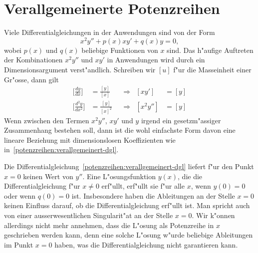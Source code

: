 \section{Verallgemeinerte Potenzreihen
\label{section:potenzreihen:verallgemeinert}}
Viele Differentialgleichungen in der Anwendungen sind von der Form
\begin{equation}
x^2y''+p(x)xy'+q(x)y=0,
\label{potenzreihen:verallgemeinert-dgl}
\end{equation}
wobei $p(x)$ und $q(x)$ beliebige Funktionen von $x$ sind.
Das h"aufige Auftreten der Kombinationen $x^2y''$ und $xy'$ in Anwendungen
wird durch ein Dimensionsargument verst"andlich.
Schreiben wir $[u]$ f"ur die Masseinheit einer Gr"osse, dann gilt
\begin{equation*}
\begin{aligned}
\biggl[\frac{dy}{dx}\biggr]
&=
\frac{[y]}{[x]}
&
&\Rightarrow&
[xy']&=[y]\\
\biggl[\frac{d^2y}{dx^2}\biggr]
&=
\frac{[y]}{[x]^2}
&
&\Rightarrow&
[x^2y'']&=[y]
\end{aligned}
\end{equation*}
Wenn zwischen den Termen $x^2y''$, $xy'$ und $y$ irgend ein
gesetzm"assiger Zusammenhang bestehen soll, dann ist die wohl
einfachste Form davon eine lineare Beziehung mit dimensionslosen
Koeffizienten wie in~\eqref{potenzreihen:verallgemeinert-dgl}.

Die Differentialgleichung~\eqref{potenzreihen:verallgemeinert-dgl}
liefert f"ur den Punkt $x=0$ keinen Wert von $y''$.
Eine L"osungsfunktion $y(x)$, die die Differentialgleichung f"ur
$x\ne 0$ erf"ullt, erf"ullt sie f"ur alle $x$, wenn $y(0)=0$ oder
wenn $q(0)=0$ ist. 
Insbesondere haben die Ableitungen an der Stelle $x=0$ keinen
Einfluss darauf, ob die Differentialgleichung erf"ullt ist.
Man spricht auch von einer ausserwesentlichen Singularit"at an
der Stelle $x=0$.
Wir k"onnen allerdings nicht mehr annehmen, dass die L"osung als
Potenzreihe in $x$ geschrieben werden kann, denn eine solche
L"osung w"urde beliebige Ableitungen im Punkt $x=0$ haben, was 
die Differentialgleichung nicht garantieren kann.

